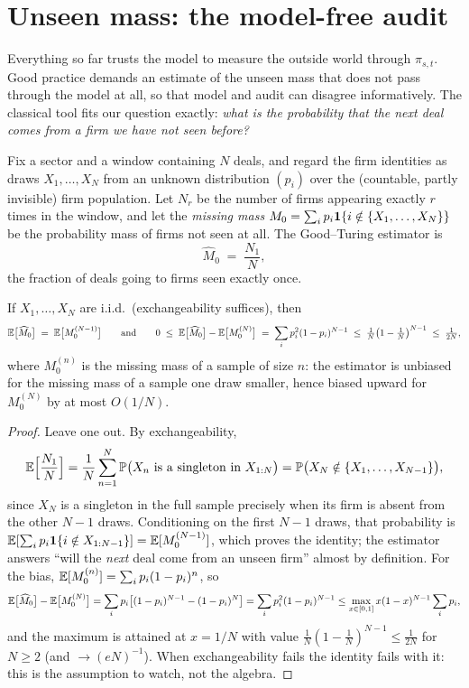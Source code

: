 \section{Unseen mass: the model-free audit}\label{ch11:sec:unseen}

Everything so far trusts the model to measure the outside world through
$\pi_{s,t}$. Good practice demands an estimate of the unseen mass that
does not pass through the model at all, so that model and audit can
disagree informatively. The classical tool fits our question exactly:
\emph{what is the probability that the next deal comes from a firm we
have not seen before?}

Fix a sector and a window containing $N$ deals, and regard the firm
identities as draws $X_1,\dots,X_N$ from an unknown distribution
$(p_i)$ over the (countable, partly invisible) firm population. Let
$N_r$ be the number of firms appearing exactly $r$ times in the window,
and let the \emph{missing mass} $M_0 = \sum_i p_i \mathbf{1}\{i \notin
\{X_1,\dots,X_N\}\}$ be the probability mass of firms not seen at all.
The Good--Turing estimator \citep{good1953} is
\begin{equation}\label{eq:ch11:gt}
\widehat M_0 \;=\; \frac{N_1}{N},
\end{equation}
the fraction of deals going to firms seen exactly once.

\begin{proposition}\label{prop:ch11:gt}
If $X_1,\dots,X_N$ are i.i.d.\ (exchangeability suffices), then
\[
\mathbb{E}\big[\widehat M_0\big] \;=\; \mathbb{E}\big[M_0^{(N-1)}\big]
\qquad\text{and}\qquad
0 \;\le\; \mathbb{E}\big[\widehat M_0\big] - \mathbb{E}\big[M_0^{(N)}\big]
 \;=\; \sum_i p_i^2 (1-p_i)^{N-1}
 \;\le\; \tfrac{1}{N}\big(1-\tfrac1N\big)^{N-1} \;\le\; \tfrac{1}{2N},
\]
where $M_0^{(n)}$ is the missing mass of a sample of size $n$: the
estimator is unbiased for the missing mass of a sample one draw smaller,
hence biased upward for $M_0^{(N)}$ by at most $O(1/N)$.
\end{proposition}

\begin{proof}
Leave one out. By exchangeability,
\[
\mathbb{E}\Big[\frac{N_1}{N}\Big]
 = \frac1N \sum_{n=1}^{N} \mathbb{P}\big(X_n \text{ is a singleton in } X_{1:N}\big)
 = \mathbb{P}\big(X_N \notin \{X_1,\dots,X_{N-1}\}\big),
\]
since $X_N$ is a singleton in the full sample precisely when its firm is
absent from the other $N-1$ draws. Conditioning on the first $N-1$
draws, that probability is $\mathbb{E}[\sum_i p_i \mathbf{1}\{i \notin X_{1:N-1}\}] =
\mathbb{E}[M_0^{(N-1)}]$, which proves the identity; the estimator answers
``will the \emph{next} deal come from an unseen firm'' almost by
definition. For the bias, $\mathbb{E}[M_0^{(n)}] = \sum_i p_i(1-p_i)^{n}$, so
\[
\mathbb{E}\big[\widehat M_0\big] - \mathbb{E}\big[M_0^{(N)}\big]
 = \sum_i p_i\big[(1-p_i)^{N-1} - (1-p_i)^{N}\big]
 = \sum_i p_i^2 (1-p_i)^{N-1}
 \le \max_{x\in[0,1]} x(1-x)^{N-1} \sum_i p_i,
\]
and the maximum is attained at $x = 1/N$ with value
$\frac1N(1-\frac1N)^{N-1} \le \frac1{2N}$ for $N\ge2$
(and $\to (eN)^{-1}$). When exchangeability fails the identity fails
with it: this is the assumption to watch, not the algebra.
\end{proof}

